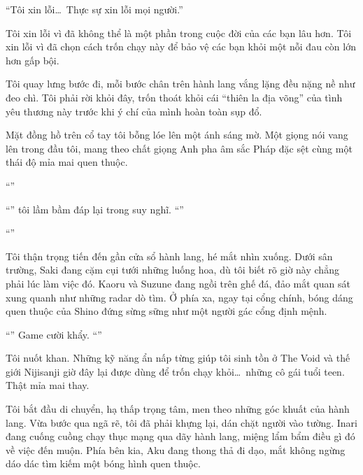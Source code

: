 \documentclass[../main.tex]{subfiles}
\begin{document}
``Tôi xin lỗi\dots\ Thực sự xin lỗi mọi người.''

Tôi xin lỗi vì đã không thể là một phần trong cuộc đời của các bạn lâu hơn. Tôi xin lỗi vì đã chọn cách trốn chạy này để bảo vệ các bạn khỏi một nỗi đau còn lớn hơn gấp bội.

Tôi quay lưng bước đi, mỗi bước chân trên hành lang vắng lặng đều nặng nề như đeo chì. Tôi phải rời khỏi đây, trốn thoát khỏi cái ``thiên la địa võng'' của tình yêu thương này trước khi ý chí của mình hoàn toàn sụp đổ.

\ct

Mặt đồng hồ trên cổ tay tôi bỗng lóe lên một ánh sáng mờ. Một giọng nói vang lên trong đầu tôi, mang theo chất giọng Anh pha âm sắc Pháp đặc sệt cùng một thái độ mỉa mai quen thuộc.

``''

``'' tôi lầm bầm đáp lại trong suy nghĩ. ``''

``''

Tôi thận trọng tiến đến gần cửa sổ hành lang, hé mắt nhìn xuống. Dưới sân trường, Saki đang cặm cụi tưới những luống hoa, dù tôi biết rõ giờ này chẳng phải lúc làm việc đó. Kaoru và Suzune đang ngồi trên ghế đá, đảo mắt quan sát xung quanh như những radar dò tìm. Ở phía xa, ngay tại cổng chính, bóng dáng quen thuộc của Shino đứng sừng sững như một người gác cổng định mệnh.

``'' Game cười khẩy. ``''

Tôi nuốt khan. Những kỹ năng ẩn nấp từng giúp tôi sinh tồn ở The Void và thế giới Nijisanji giờ đây lại được dùng để trốn chạy khỏi\dots\ những cô gái tuổi teen. Thật mỉa mai thay.

Tôi bắt đầu di chuyển, hạ thấp trọng tâm, men theo những góc khuất của hành lang. Vừa bước qua ngã rẽ, tôi đã phải khựng lại, dán chặt người vào tường. Inari đang cuống cuồng chạy thục mạng qua dãy hành lang, miệng lẩm bẩm điều gì đó về việc đến muộn. Phía bên kia, Aku đang thong thả đi dạo, mắt không ngừng dáo dác tìm kiếm một bóng hình quen thuộc.
\end{document}
